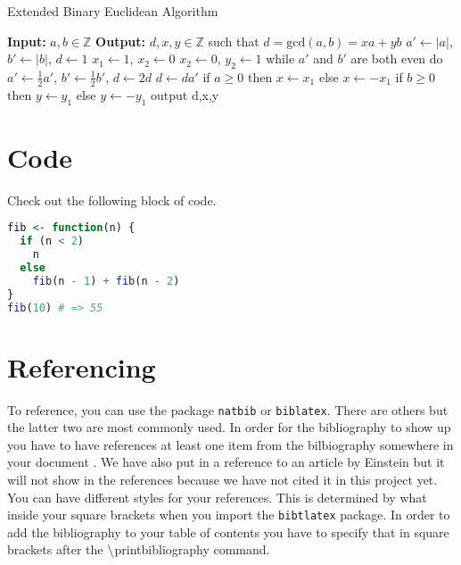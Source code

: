 \begin{algorithm}
\caption{Extended Binary Euclidean Algorithm}
\label{alg:Ext-bin-eucl}
\textbf{Input:} $a,b\in\mathbb{Z}$\;
\textbf{Output:} $d,x,y\in\mathbb{Z}$ such that $d=\text{gcd}(a,b)=xa+yb$\;
$a' \gets |a|$, $b' \gets |b|$, $d \gets 1$\;
$x_1 \gets 1$, $x_2 \gets 0$\;
$x_2 \gets 0$, $y_2 \gets 1$\;
while $a'$ and $b'$ are both even do $a' \gets \frac{1}{2}a'$, $b' \gets \frac{1}{2}b'$, $d\gets2d$\;
$d \gets d a'$\;
if $a\geq0$ then $x\gets x_1$ else $x\gets-x_1$\;
if $b\geq0$ then $y\gets y_1$ else $y\gets-y_1$\;
output d,x,y\;
\end{algorithm}

\section{Code}
Check out the following block of code.

\begin{lstlisting}[language=R]
fib <- function(n) {
  if (n < 2)
    n
  else
    fib(n - 1) + fib(n - 2)
}
fib(10) # => 55
\end{lstlisting}

\section{Referencing}
To reference, you can use the package \texttt{natbib} or \texttt{biblatex}. There are others but the latter two are most commonly used. In order for the bibliography to show up you have to have references at least one item from the bilbiography somewhere in your document \cite{article}. We have also put in a reference to an article by Einstein but it will not show in the references because we have not cited it in this project yet. You can have different styles for your references. This is determined by what inside your square brackets when you import the \texttt{bibtlatex} package. In order to add the bibliography to your table of contents you have to specify that in square brackets after the $\bs$printbibliography command.


\newpage
\printbibliography[heading=bibintoc,
title={Whole bibliography}]